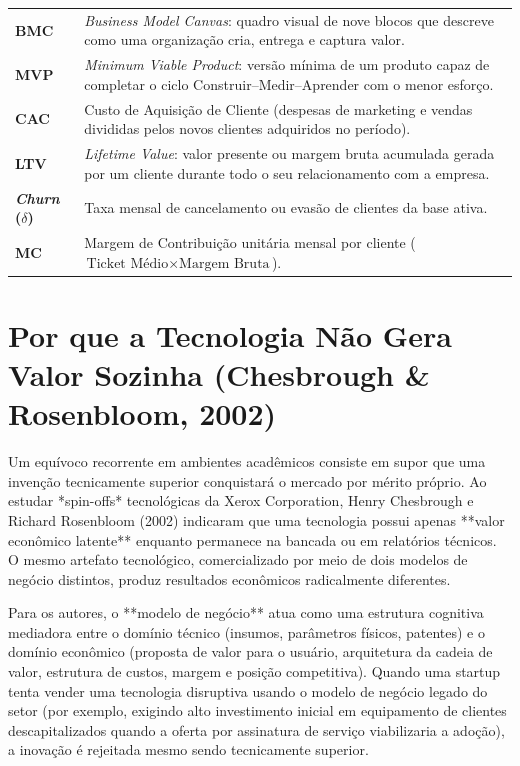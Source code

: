 
\begin{boxSimbolo}
  \begin{tabularx}{\textwidth}{@{}l >{\raggedright\arraybackslash}X@{}}
    \textbf{BMC} & \textit{Business Model Canvas}: quadro visual de nove blocos que descreve como uma organização cria, entrega e captura valor. \\
    \textbf{MVP} & \textit{Minimum Viable Product}: versão mínima de um produto capaz de completar o ciclo Construir–Medir–Aprender com o menor esforço. \\
    \textbf{CAC} & Custo de Aquisição de Cliente (despesas de marketing e vendas divididas pelos novos clientes adquiridos no período). \\
    \textbf{LTV} & \textit{Lifetime Value}: valor presente ou margem bruta acumulada gerada por um cliente durante todo o seu relacionamento com a empresa. \\
    \textbf{\textit{Churn} ($\delta$)} & Taxa mensal de cancelamento ou evasão de clientes da base ativa. \\
    \textbf{MC} & Margem de Contribuição unitária mensal por cliente ($\text{Ticket Médio} \times \text{Margem Bruta}$). \\
  \end{tabularx}
\end{boxSimbolo}

\section{Por que a Tecnologia Não Gera Valor Sozinha (Chesbrough \& Rosenbloom, 2002)}

Um equívoco recorrente em ambientes acadêmicos consiste em supor que uma invenção tecnicamente superior conquistará o mercado por mérito próprio. Ao estudar *spin-offs* tecnológicas da Xerox Corporation, Henry Chesbrough e Richard Rosenbloom (2002) indicaram que uma tecnologia possui apenas **valor econômico latente** enquanto permanece na bancada ou em relatórios técnicos. O mesmo artefato tecnológico, comercializado por meio de dois modelos de negócio distintos, produz resultados econômicos radicalmente diferentes.

Para os autores, o **modelo de negócio** atua como uma estrutura cognitiva mediadora entre o domínio técnico (insumos, parâmetros físicos, patentes) e o domínio econômico (proposta de valor para o usuário, arquitetura da cadeia de valor, estrutura de custos, margem e posição competitiva). Quando uma startup tenta vender uma tecnologia disruptiva usando o modelo de negócio legado do setor (por exemplo, exigindo alto investimento inicial em equipamento de clientes descapitalizados quando a oferta por assinatura de serviço viabilizaria a adoção), a inovação é rejeitada mesmo sendo tecnicamente superior.

